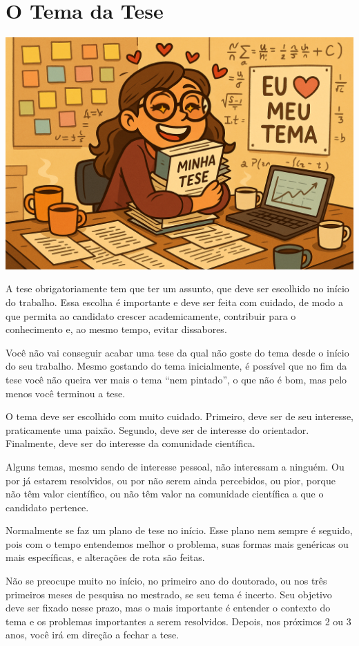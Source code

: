 \chapter{O Tema da Tese}

\begin{center}
\includegraphics[width=0.5\linewidth]{Images/amomeutema.png}    
\end{center}
\vspace{0.5cm}

A tese obrigatoriamente tem que ter um assunto, que deve ser escolhido no início do trabalho. Essa escolha é importante e deve ser feita com cuidado, de modo a que permita ao candidato crescer academicamente, contribuir para o conhecimento e, ao mesmo tempo, evitar dissabores.


Você não vai conseguir acabar uma tese da qual não goste do tema desde o início do seu trabalho. Mesmo gostando do tema inicialmente, é possível que no fim da tese você não queira ver mais o tema ``nem pintado'', o que não é bom, mas pelo menos você terminou a tese.

O tema deve ser escolhido com muito cuidado. Primeiro, deve ser de seu interesse, praticamente uma paixão. Segundo, deve ser de interesse do orientador. Finalmente, deve ser do interesse da comunidade científica.

Alguns temas, mesmo sendo de interesse pessoal, não interessam a ninguém. Ou por já estarem resolvidos, ou por não serem ainda percebidos, ou pior, porque não têm valor científico, ou não têm valor na comunidade científica a que o candidato pertence.

Normalmente se faz um plano de tese no início. Esse plano nem sempre é seguido, pois com o tempo entendemos melhor o problema, suas formas mais genéricas ou mais específicas, e alterações de rota são feitas.

Não se preocupe muito no início, no primeiro ano do doutorado, ou nos três primeiros meses de pesquisa no mestrado, se seu tema é incerto. Seu objetivo deve ser fixado nesse prazo, mas o mais importante é entender o contexto do tema e os problemas importantes a serem resolvidos. Depois, nos próximos 2 ou 3 anos, você irá em direção a fechar a tese.

